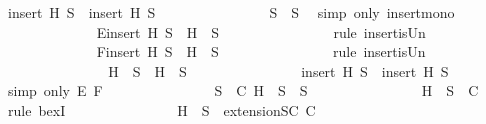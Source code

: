 \begin{isabellebody}
\ {\isachardoublequoteopen}insert\ H\ S{\isacharprime}\ {\isasymsubseteq}\ insert\ H\ S{\isachardoublequoteclose}\isanewline
\ \ \ \ \ \ \ \ \ \ \ \ \ \ \isamarkupfalse%
\ {\isacartoucheopen}S{\isacharprime}\ {\isasymsubseteq}\ S{\isacartoucheclose}\ \isamarkupfalse%
\ {\isacharparenleft}simp\ only{\isacharcolon}\ insert{\isacharunderscore}mono{\isacharparenright}\isanewline
\ \ \ \ \ \ \ \ \ \ \ \ \isamarkupfalse%
\ E{\isacharcolon}{\isachardoublequoteopen}insert\ H\ S{\isacharprime}\ {\isacharequal}\ {\isacharbraceleft}H{\isacharbraceright}\ {\isasymunion}\ S{\isacharprime}{\isachardoublequoteclose}\isanewline
\ \ \ \ \ \ \ \ \ \ \ \ \ \ \isamarkupfalse%
\ {\isacharparenleft}rule\ insert{\isacharunderscore}is{\isacharunderscore}Un{\isacharparenright}\isanewline
\ \ \ \ \ \ \ \ \ \ \ \ \isamarkupfalse%
\ F{\isacharcolon}{\isachardoublequoteopen}insert\ H\ S\ {\isacharequal}\ {\isacharbraceleft}H{\isacharbraceright}\ {\isasymunion}\ S{\isachardoublequoteclose}\isanewline
\ \ \ \ \ \ \ \ \ \ \ \ \ \ \isamarkupfalse%
\ {\isacharparenleft}rule\ insert{\isacharunderscore}is{\isacharunderscore}Un{\isacharparenright}\isanewline
\ \ \ \ \ \ \ \ \ \ \ \ \isamarkupfalse%
\ \isamarkupfalse%
\ {\isachardoublequoteopen}{\isacharbraceleft}H{\isacharbraceright}\ {\isasymunion}\ S{\isacharprime}\ {\isasymsubseteq}\ {\isacharbraceleft}H{\isacharbraceright}\ {\isasymunion}\ S{\isachardoublequoteclose}\isanewline
\ \ \ \ \ \ \ \ \ \ \ \ \ \ \isamarkupfalse%
\ {\isacartoucheopen}insert\ H\ S{\isacharprime}\ {\isasymsubseteq}\ insert\ H\ S{\isacartoucheclose}\ \isamarkupfalse%
\ {\isacharparenleft}simp\ only{\isacharcolon}\ E\ F{\isacharparenright}\isanewline
\ \ \ \ \ \ \ \ \ \ \ \ \isamarkupfalse%
\ \isamarkupfalse%
\ {\isachardoublequoteopen}{\isasymexists}S\ {\isasymin}\ C{\isachardot}\ {\isacharbraceleft}H{\isacharbraceright}\ {\isasymunion}\ S{\isacharprime}\ {\isasymsubseteq}\ S{\isachardoublequoteclose}\isanewline
\ \ \ \ \ \ \ \ \ \ \ \ \ \ \isamarkupfalse%
\ {\isacartoucheopen}{\isacharbraceleft}H{\isacharbraceright}\ {\isasymunion}\ S\ {\isasymin}\ C{\isacartoucheclose}\ \isamarkupfalse%
\ {\isacharparenleft}rule\ bexI{\isacharparenright}\isanewline
\ \ \ \ \ \ \ \ \ \ \ \ \isamarkupfalse%
\ \isamarkupfalse%
\ {\isachardoublequoteopen}{\isacharbraceleft}H{\isacharbraceright}\ {\isasymunion}\ S{\isacharprime}\ {\isasymin}\ {\isacharparenleft}extensionSC\ C{\isacharparenright}{\isachardoublequoteclose}\isanewline

\end{isabellebody}
